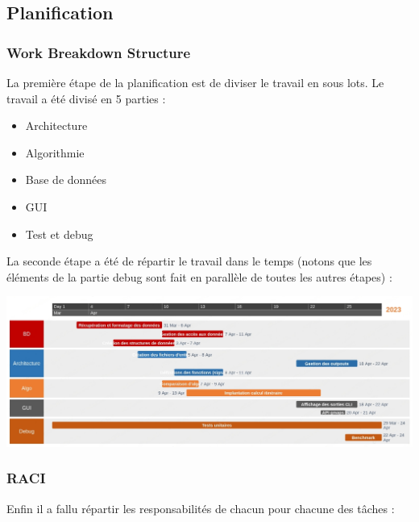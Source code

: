 \documentclass[a4paper, 12pt]{report}
\begin{document}
\subsection{Planification}

\subsubsection{Work Breakdown Structure}

La première étape de la planification est de diviser le travail en sous lots. Le travail a été divisé en 5 parties :

\begin{itemize}
    \item Architecture
    \item Algorithmie
    \item Base de données
    \item GUI
    \item Test et debug
\end{itemize}
\bigskip

La seconde étape a été de répartir le travail dans le temps (notons que les éléments de la partie debug sont fait en parallèle de toutes les autres étapes) :
\bigskip

\includegraphics[scale = 0.35]{./IMG/Gantt.png}
\clearpage

\subsubsection{RACI}

Enfin il a fallu répartir les responsabilités de chacun pour chacune des tâches :
\end{document}
